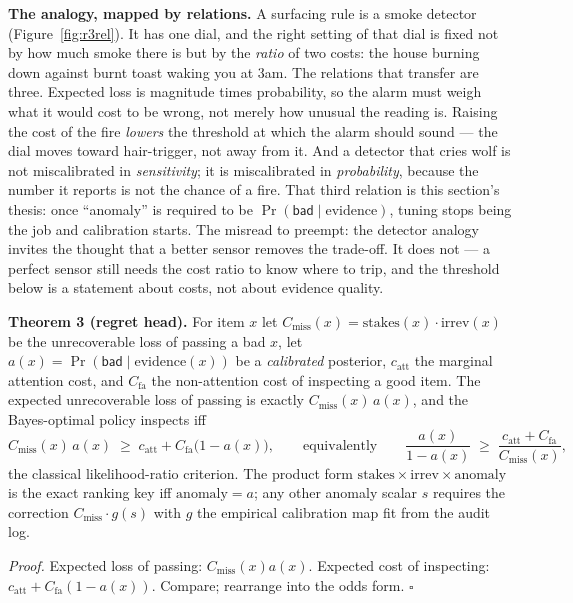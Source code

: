 \documentclass[11pt,a4paper]{article}
\begin{document}
\textbf{The analogy, mapped by relations.} A surfacing rule is a smoke detector (Figure~\ref{fig:r3rel}). It has one dial, and the right setting of that dial is fixed not by how much smoke there is but by the \emph{ratio} of two costs: the house burning down against burnt toast waking you at 3am. The relations that transfer are three. Expected loss is magnitude times probability, so the alarm must weigh what it would cost to be wrong, not merely how unusual the reading is. Raising the cost of the fire \emph{lowers} the threshold at which the alarm should sound --- the dial moves toward hair-trigger, not away from it. And a detector that cries wolf is not miscalibrated in \emph{sensitivity}; it is miscalibrated in \emph{probability}, because the number it reports is not the chance of a fire. That third relation is this section's thesis: once ``anomaly'' is required to be $\Pr(\mathsf{bad}\mid\text{evidence})$, tuning stops being the job and calibration starts. The misread to preempt: the detector analogy invites the thought that a better sensor removes the trade-off. It does not --- a perfect sensor still needs the cost ratio to know where to trip, and the threshold below is a statement about costs, not about evidence quality.



\begin{thebox}
\textbf{Theorem 3 (regret head).} For item $x$ let $C_{\mathrm{miss}}(x)=\mathrm{stakes}(x)\cdot\mathrm{irrev}(x)$ be the unrecoverable loss of passing a bad $x$, let $a(x)=\Pr(\mathsf{bad}\mid\text{evidence}(x))$ be a \emph{calibrated} posterior, $c_{\mathrm{att}}$ the marginal attention cost, and $C_{\mathrm{fa}}$ the non-attention cost of inspecting a good item. The expected unrecoverable loss of passing is exactly $C_{\mathrm{miss}}(x)\,a(x)$, and the Bayes-optimal policy inspects iff
\[
C_{\mathrm{miss}}(x)\,a(x)\;\ge\;c_{\mathrm{att}}+C_{\mathrm{fa}}\bigl(1-a(x)\bigr),
\qquad\text{equivalently}\qquad
\frac{a(x)}{1-a(x)}\;\ge\;\frac{c_{\mathrm{att}}+C_{\mathrm{fa}}}{C_{\mathrm{miss}}(x)},
\]
the classical likelihood-ratio criterion. The product form $\mathrm{stakes}\times\mathrm{irrev}\times\mathrm{anomaly}$ is the exact ranking key iff $\mathrm{anomaly}=a$; any other anomaly scalar $s$ requires the correction $C_{\mathrm{miss}}\cdot g(s)$ with $g$ the empirical calibration map fit from the audit log.

\emph{Proof.} Expected loss of passing: $C_{\mathrm{miss}}(x)a(x)$. Expected cost of inspecting: $c_{\mathrm{att}}+C_{\mathrm{fa}}(1-a(x))$. Compare; rearrange into the odds form. $\square$
\end{thebox}
\end{document}
